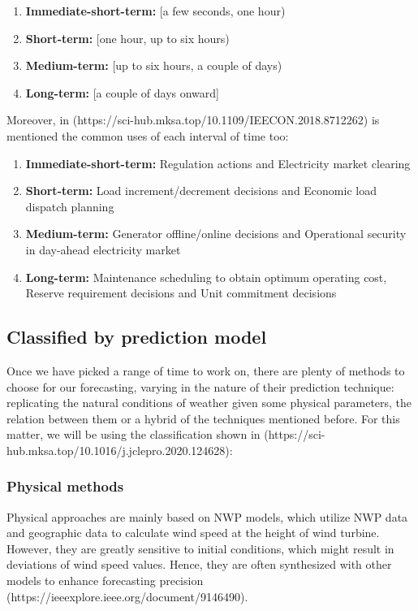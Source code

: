 \begin{enumerate}
    \item \textbf{Immediate-short-term:}  [a few seconds, one hour)
    \item \textbf{Short-term:} [one hour, up to six hours)
    \item \textbf{Medium-term:} [up to six hours, a couple of days)
    \item \textbf{Long-term:} [a couple of days onward]
\end{enumerate}

Moreover, in (https://sci-hub.mksa.top/10.1109/IEECON.2018.8712262) is mentioned the common uses of each interval of time too:

\begin{enumerate}
    \item \textbf{Immediate-short-term:}  Regulation actions and Electricity market clearing
    \item \textbf{Short-term:} Load increment/decrement decisions and Economic load dispatch planning
    \item \textbf{Medium-term:} Generator offline/online decisions and Operational security in day-ahead electricity market
    \item \textbf{Long-term:} Maintenance scheduling to obtain optimum operating cost, Reserve requirement decisions and Unit commitment decisions
\end{enumerate}

\subsection{Classified by prediction model}

Once we have picked a range of time to work on, there are plenty of methods to choose for our forecasting, varying in the nature of their prediction technique: replicating the natural conditions of weather given some physical parameters, the relation between them or a hybrid of the techniques mentioned before. For this matter, we will be using the classification shown in (https://sci-hub.mksa.top/10.1016/j.jclepro.2020.124628):

\subsubsection{Physical methods}

Physical approaches are mainly based on NWP models, which utilize NWP data and geographic data to calculate wind speed at the height of wind turbine. However, they are greatly sensitive to initial conditions, which might result in deviations of wind speed values. Hence, they are often synthesized with other models to enhance forecasting precision (https://ieeexplore.ieee.org/document/9146490).

